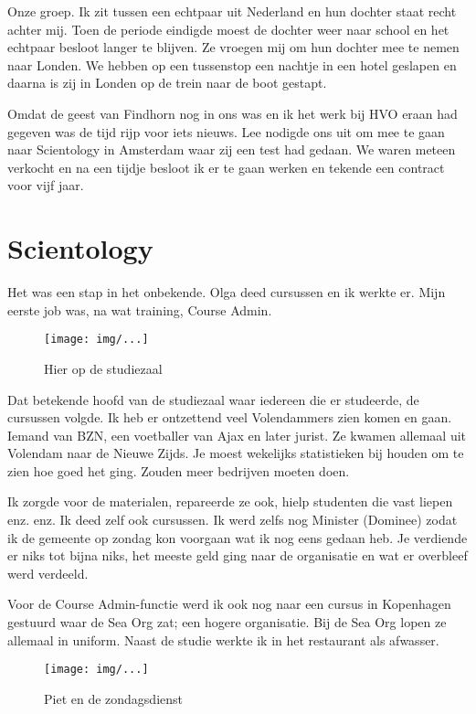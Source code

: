 \documentclass[10pt,twoside,openright]{memoir}
\begin{document}
Onze groep. Ik zit tussen een echtpaar uit Nederland en hun dochter staat recht achter mij. Toen de periode eindigde moest de dochter weer naar school en het echtpaar besloot langer te blijven. Ze vroegen mij om hun dochter mee te nemen naar Londen. We hebben op een tussenstop een nachtje in een hotel geslapen en daarna is zij in Londen op de trein naar de boot gestapt.

Omdat de geest van Findhorn nog in ons was en ik het werk bij HVO eraan had gegeven was de tijd rijp voor iets nieuws. Lee nodigde ons uit om mee te gaan naar Scientology in Amsterdam waar zij een test had gedaan. We waren meteen verkocht en na een tijdje besloot ik er te gaan werken en tekende een contract voor vijf jaar. 

\chapter{Scientology} %
\label{cha:scientologu}

Het was een stap in het onbekende. Olga deed cursussen en ik werkte er. Mijn eerste job was, na wat training, Course Admin. 

\begin{figure}[t]
\texttt{[image: img/...]}
\caption{Hier op de studiezaal}
\end{figure}

Dat betekende hoofd van de studiezaal waar iedereen die er studeerde, de cursussen volgde. Ik heb er ontzettend veel Volendammers zien komen en gaan. Iemand van BZN, een voetballer van Ajax en later jurist. Ze kwamen allemaal uit Volendam naar de Nieuwe Zijds. Je moest wekelijks statistieken bij houden om te zien hoe goed het ging. Zouden meer bedrijven moeten doen.

Ik zorgde voor de materialen, repareerde ze ook, hielp studenten die vast liepen enz. enz. Ik deed zelf ook cursussen. Ik werd zelfs nog Minister (Dominee) zodat ik de gemeente op zondag kon voorgaan wat ik nog eens gedaan heb. Je verdiende er niks tot bijna niks, het meeste geld ging naar de organisatie en wat er overbleef werd verdeeld. 

Voor de Course Admin-functie werd ik ook nog naar een cursus in Kopenhagen gestuurd waar de Sea Org zat; een hogere organisatie. Bij de Sea Org lopen ze allemaal in uniform. Naast de studie werkte ik in het restaurant als afwasser.

\begin{figure}[t]
\texttt{[image: img/...]}
\caption{Piet en de zondagsdienst}
\end{figure}
\end{document}
